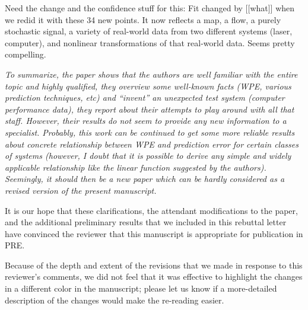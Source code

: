 \documentclass[12pt]{article}
\newcommand{\alert}[1]{{\color{red}#1}}
\begin{document}
\alert{Need the change and the confidence stuff for this: Fit changed
  by [[what]] when we redid it with these 34 new points.}  It now
reflects a map, a flow, a purely stochastic signal, a variety of
real-world data from two different systems (laser, computer), and
nonlinear transformations of that real-world data.  Seems pretty
compelling.

\emph{To summarize, the paper shows that the authors are well familiar
  with the entire topic and highly qualified, they overview some
  well-known facts (WPE, various prediction techniques, etc) and
  ``invent'' an unexpected test system (computer performance data),
  they report about their attempts to play around with all that
  staff. However, their results do not seem to provide any new
  information to a specialist. Probably, this work can be continued to
  get some more reliable results about concrete relationship between
  WPE and prediction error for certain classes of systems (however, I
  doubt that it is possible to derive any simple and widely applicable
  relationship like the linear function suggested by the
  authors). Seemingly, it should then be a new paper which can be
  hardly considered as a revised version of the present manuscript.}

It is our hope that these clarifications, the attendant modifications
to the paper, and the additional preliminary results that we included
in this rebuttal letter have convinced the reviewer that this
manuscript is appropriate for publication in PRE.

Because of the depth and extent of the revisions that we made in
response to this reviewer's comments, we did not feel that it was
effective to highlight the changes in a different color in the
manuscript; please let us know if a more-detailed description of the
changes would make the re-reading easier.
\end{document}
